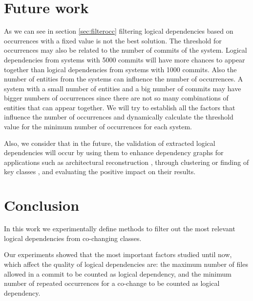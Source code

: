 \documentclass[conference]{IEEEtran}
\begin{document}
\section{Future work}
\label{sec:future}
As we can see in section \ref{sec:filterocc} filtering logical dependencies based on occurrences with a fixed value is not the best solution.
The threshold for occurrences may also be related to the number of commits of the system. Logical dependencies from systems with 5000 commits will have more chances to appear together than logical dependencies from systems with 1000 commits. Also the number of entities from the systems can influence the number of occurrences. A system with a small number of entities and a big number of commits may have bigger numbers of occurrences since there are not so many combinations of entities that can appear together.
We will try to establish all the factors that influence the number of occurrences and dynamically calculate the threshold value for the minimum number of occurrences for each system.

Also, we consider that in the future, the validation of extracted logical dependencies will occur by using them to enhance dependency graphs for applications such as architectural reconstruction \cite{Shtern:2012:CMS:2332427.2332428}, \cite{sar}  through clustering \cite{SoraConti} or finding of key classes \cite{PagerankENASE}, and evaluating the positive impact on their results.


\section{Conclusion}
\label{sec:conclusion}
In this work we experimentally define methods to filter out the most relevant logical dependencies from co-changing classes. 

Our experiments showed that the most important factors studied until now, which affect the quality of logical dependencies are: the maximum number of files allowed in a commit to be counted as logical dependency, and the minimum number of repeated occurrences for a co-change to be counted as logical dependency.




\end{document}
